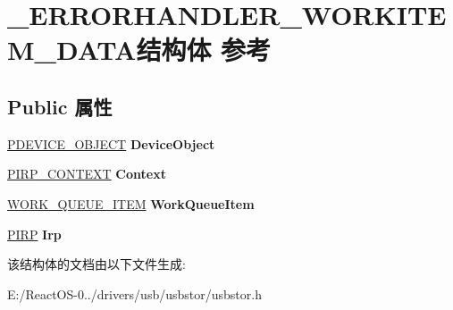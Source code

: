 \hypertarget{struct___e_r_r_o_r_h_a_n_d_l_e_r___w_o_r_k_i_t_e_m___d_a_t_a}{}\section{\+\_\+\+E\+R\+R\+O\+R\+H\+A\+N\+D\+L\+E\+R\+\_\+\+W\+O\+R\+K\+I\+T\+E\+M\+\_\+\+D\+A\+T\+A结构体 参考}
\label{struct___e_r_r_o_r_h_a_n_d_l_e_r___w_o_r_k_i_t_e_m___d_a_t_a}
\subsection*{Public 属性}
\begin{DoxyCompactItemize}
\item 
\mbox{\label{struct___e_r_r_o_r_h_a_n_d_l_e_r___w_o_r_k_i_t_e_m___d_a_t_a_a5dc1da09a2487091576ada817db2566b}} 
\hyperlink{struct___d_e_v_i_c_e___o_b_j_e_c_t}{P\+D\+E\+V\+I\+C\+E\+\_\+\+O\+B\+J\+E\+CT} {\bfseries Device\+Object}
\item 
\mbox{\label{struct___e_r_r_o_r_h_a_n_d_l_e_r___w_o_r_k_i_t_e_m___d_a_t_a_ac574498c7ac94ffe9ba9ecd292522503}} 
\hyperlink{struct_i_r_p___c_o_n_t_e_x_t}{P\+I\+R\+P\+\_\+\+C\+O\+N\+T\+E\+XT} {\bfseries Context}
\item 
\mbox{\label{struct___e_r_r_o_r_h_a_n_d_l_e_r___w_o_r_k_i_t_e_m___d_a_t_a_ace23389a9aa7157ef83d2fd4e0afdd31}} 
\hyperlink{struct___w_o_r_k___q_u_e_u_e___i_t_e_m}{W\+O\+R\+K\+\_\+\+Q\+U\+E\+U\+E\+\_\+\+I\+T\+EM} {\bfseries Work\+Queue\+Item}
\item 
\mbox{\label{struct___e_r_r_o_r_h_a_n_d_l_e_r___w_o_r_k_i_t_e_m___d_a_t_a_ae318237e4f1d526864bfd3fe3c4e6aea}} 
\hyperlink{interfacevoid}{P\+I\+RP} {\bfseries Irp}
\end{DoxyCompactItemize}


该结构体的文档由以下文件生成\+:\begin{DoxyCompactItemize}
\item 
E\+:/\+React\+O\+S-\/0../drivers/usb/usbstor/usbstor.\+h\end{DoxyCompactItemize}

